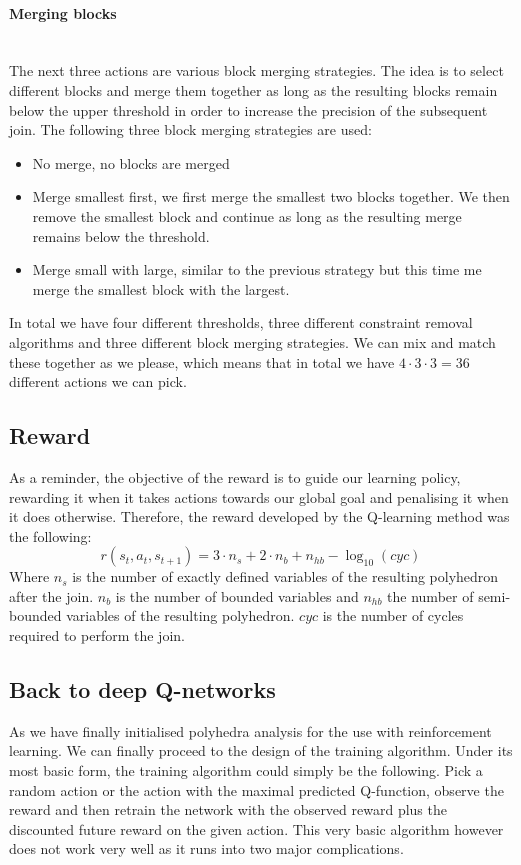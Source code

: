 \paragraph{Merging blocks}\mbox{}\\
The next three actions are various block merging strategies. The idea is to select different blocks and merge them together as long as the resulting blocks remain below the upper threshold in order to increase the precision of the subsequent join. The following three block merging strategies are used:
\begin{itemize}
	\item No merge, no blocks are merged
	\item Merge smallest first, we first merge the smallest two blocks together. We then remove the smallest block and continue as long as the resulting merge remains below the threshold.
	\item Merge small with large, similar to the previous strategy but this time me merge the smallest block with the largest.
\end{itemize}

In total we have four different thresholds, three different constraint removal algorithms and three different block merging strategies. We can mix and match these together as we please, which means that in total we have $4\cdot 3\cdot 3 =36$ different actions we can pick.

\subsection{Reward}
As a reminder, the objective of the reward is to guide our learning policy, rewarding it when it takes actions towards our global goal and penalising it when it does otherwise. Therefore, the reward developed by the Q-learning method was the following:
\begin{equation}
	r(s_t,a_t,s_{t+1}) = 3  \cdot n_s + 2 \cdot n_b + n_{hb} - \log_{10}(cyc)
\end{equation}
Where $n_s$ is the number of exactly defined variables of the resulting polyhedron after the join. $n_b$ is the number of bounded variables and $n_{hb}$ the number of semi-bounded variables of the resulting polyhedron. $cyc$ is the number of cycles required to perform the join.
\subsection{Back to deep Q-networks}
As we have finally initialised polyhedra analysis for the use with reinforcement learning. We can finally proceed to the design of the training algorithm. Under its most basic form, the training algorithm could simply be the following. Pick a random action or the action with the maximal predicted Q-function, observe the reward and then retrain the network with the observed reward plus the discounted future reward on the given action. This very basic algorithm however does not work very well as it runs into two major complications.

